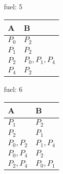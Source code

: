     \begin{minipage}[t]{0.30\textwidth}
        fuel: 5\\
    \begin{tabular}{l|l}
        A & B \\\hline
        $P_0$ & $P_2$ \\
        $P_1$ & $P_2$ \\
        $P_2$ & $P_0, P_1, P_4$ \\
        $P_4$ & $P_2$ \\
    \end{tabular}
    \end{minipage}
    \begin{minipage}[t]{0.30\textwidth}
        fuel: 6\\
    \begin{tabular}{l|l}
        A & B \\\hline
        $P_1$ & $P_2$ \\
        $P_2$ & $P_1$ \\
        $P_0, P_2$ & $P_1, P_4$ \\
        $P_0, P_4$ & $P_2$ \\
        $P_2, P_4$ & $P_0, P_1$ \\
    \end{tabular}
    \end{minipage}